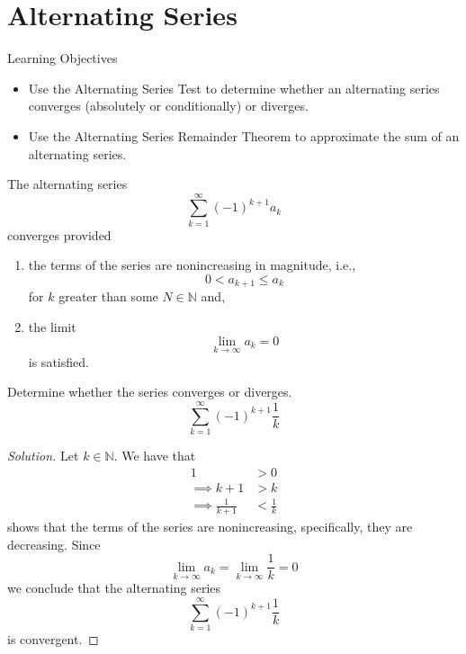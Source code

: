 \documentclass[compacto,10pt,comentarios]{aleph-notas}
\begin{document}
\encabezado
\section*{Alternating Series}
\begin{mdframed}
    \center Learning Objectives \\
    \begin{itemize}
        \item Use the Alternating Series Test to determine whether an alternating series converges (absolutely or conditionally) or diverges.
        \item Use the Alternating Series Remainder Theorem to approximate the sum of an alternating series.
    \end{itemize}
\end{mdframed}

\begin{teo}
    The alternating series
    $$
        \sum_{k=1}^{\infty} (-1)^{k+1} a_k
    $$
    converges provided
    \begin{enumerate}
        \item the terms of the series are nonincreasing in magnitude, i.e.,
        $$
            0 < a_{k+1} \leq a_{k}
        $$
        for $k$ greater than some $N \in \mathbb{N}$ and,
        \item the limit 
        $$
            \lim_{k \to \infty} a_k = 0
        $$
        is satisfied.
    \end{enumerate}
\end{teo}

\begin{ejer}
    Determine whether the series converges or diverges.
    $$
        \sum_{k=1}^{\infty} (-1)^{k+1} \frac{1}{k}
    $$
\end{ejer}
\begin{proof}[Solution]
    Let $k \in \mathbb{N}$. We have that
    \begin{align*}
    1 & > 0 \\
    \implies k + 1 & > k \\
    \implies \frac{1}{k+1} & < \frac{1}{k}
    \end{align*}
    shows that the terms of the series are nonincreasing, specifically, they are decreasing. Since
    $$
        \lim_{k \to \infty} a_k = \lim_{k \to \infty} \frac{1}{k} = 0
    $$
    we conclude that the alternating series
    $$
        \sum_{k=1}^{\infty} (-1)^{k+1} \frac{1}{k}
    $$
    is convergent.
\end{proof}
\end{document}

